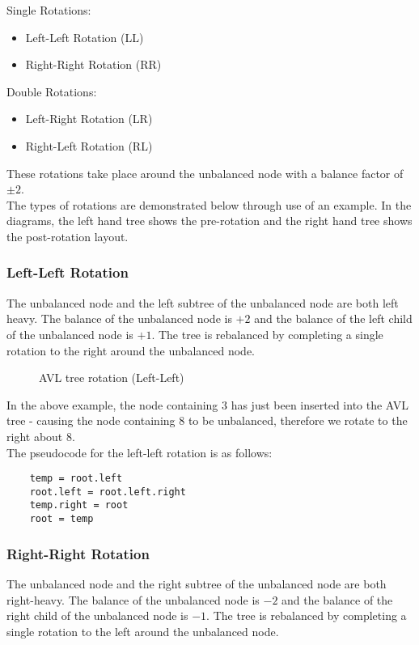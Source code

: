 Single Rotations:
\begin{itemize}
    \item Left-Left Rotation (LL)
    \item Right-Right Rotation (RR)
\end{itemize}
Double Rotations:
\begin{itemize}
    \item Left-Right Rotation (LR)
    \item Right-Left Rotation (RL)
\end{itemize}
These rotations take place around the unbalanced node with a balance factor of $\pm 2$.\\

The types of rotations are demonstrated below through use of an example. In the diagrams, the left hand tree shows the pre-rotation and the right hand tree shows the post-rotation layout.
\subsubsection{Left-Left Rotation}
The unbalanced node and the left subtree of the unbalanced node are both left heavy. The balance of the unbalanced node is $+2$ and the balance of the left child of the unbalanced node is $+1$. The tree is rebalanced by completing a single rotation to the right around the unbalanced node.
\begin{figure}[H]
    \centering
    
    \caption{AVL tree rotation (Left-Left)}
\end{figure}

In the above example, the node containing $3$ has just been inserted into the AVL tree - causing the node containing $8$ to be unbalanced, therefore we rotate to the right about 8. \\

The pseudocode for the left-left rotation is as follows:
\begin{verbatim}
    temp = root.left
    root.left = root.left.right
    temp.right = root
    root = temp
\end{verbatim}

\subsubsection{Right-Right Rotation}
The unbalanced node and the right subtree of the unbalanced node are both right-heavy. The balance of the unbalanced node is $-2$ and the balance of the right child of the unbalanced node is $-1$. The tree is rebalanced by completing a single rotation to the left around the unbalanced node.\\

